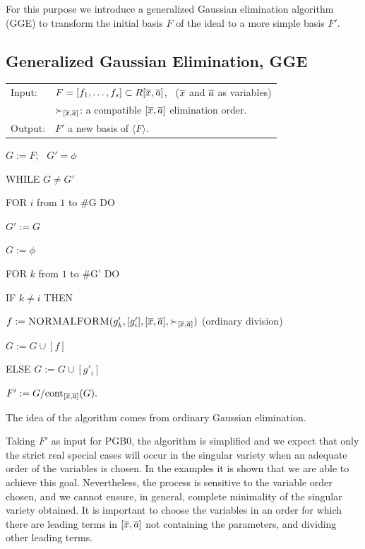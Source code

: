  For this purpose we introduce a generalized Gaussian
elimination algorithm ({\sc GGE}) to transform the initial basis
$F$ of the ideal to a more simple basis $F'$.

\subsection{Generalized Gaussian Elimination, GGE}

\begin{tabular}{lp{10.5cm}}
Input: & $F=[f_1,\dots,f_s] \subset R[\overline{x},\overline{a}]$,  \ ($\overline{x}$ and
$\overline{a}$ as variables)  \\ & $\succ_{[\overline{x},\overline{a}]}$: a compatible
$[\overline{x},\overline{a}]$ elimination order.
\\ Output: & $F'$ a new basis of $\langle F \rangle$.
\\
\end{tabular}

\hs $G:=F$; \ $ G'=\phi$

\hs WHILE  $G \ne G'$

\hs \hs FOR $i$ from $1$ to \#G DO

\hs \hs \hs $G':=G$



\hs \hs \hs $G:=\phi$

\hs \hs \hs FOR $k$ from $1$ to \#G' DO

\hs \hs \hs \hs IF $k \ne i$ THEN

\hs \hs \hs \hs \hs $f:=\hbox{\sc
NORMALFORM}(g'_k,[g'_i],[\overline{x},\overline{a}],\succ_{[\overline{x},\overline{a}]})$ (ordinary
division)

\hs \hs \hs \hs \hs $G:=G \cup [f]$

\hs \hs \hs \hs ELSE $G:=G \cup [g'_i]$






\hs $F':=G / \hbox{cont}_{[\overline{x},\overline{a}]}(G).$

\vs

The idea of the algorithm comes from ordinary Gaussian
elimination.

Taking $F'$ as input for {\sc PGB0}, the algorithm is simplified
and we expect that only the strict real special cases will occur
in the singular variety when an adequate order of the variables is
chosen. In the examples it is shown that we are able to achieve
this goal. Nevertheless, the process is sensitive to the variable
order chosen, and we cannot ensure, in general, complete
minimality of the singular variety obtained. It is important to
choose the variables in an order for which there are leading terms
in $[\overline{x},\overline{a}]$ not containing the parameters, and dividing other
leading terms.

